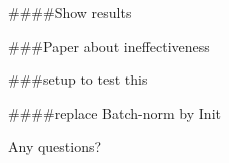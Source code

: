 \documentclass[10pt]{beamer}
\begin{document}
####Show results

###Paper about ineffectiveness

###setup to test this

####replace Batch-norm by Init



\begin{frame}{ }
\begin{center}
     \Huge Any questions?
\end{center}
   
\end{frame}
\end{document}
